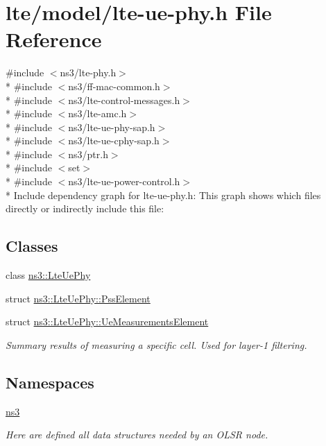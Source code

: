 \hypertarget{lte-ue-phy_8h}{}\section{lte/model/lte-\/ue-\/phy.h File Reference}
\label{lte-ue-phy_8h}
{\ttfamily \#include $<$ns3/lte-\/phy.\+h$>$}\\*
{\ttfamily \#include $<$ns3/ff-\/mac-\/common.\+h$>$}\\*
{\ttfamily \#include $<$ns3/lte-\/control-\/messages.\+h$>$}\\*
{\ttfamily \#include $<$ns3/lte-\/amc.\+h$>$}\\*
{\ttfamily \#include $<$ns3/lte-\/ue-\/phy-\/sap.\+h$>$}\\*
{\ttfamily \#include $<$ns3/lte-\/ue-\/cphy-\/sap.\+h$>$}\\*
{\ttfamily \#include $<$ns3/ptr.\+h$>$}\\*
{\ttfamily \#include $<$set$>$}\\*
{\ttfamily \#include $<$ns3/lte-\/ue-\/power-\/control.\+h$>$}\\*
Include dependency graph for lte-\/ue-\/phy.h\+:
This graph shows which files directly or indirectly include this file\+:
\subsection*{Classes}
\begin{DoxyCompactItemize}
\item 
class \hyperlink{classns3_1_1LteUePhy}{ns3\+::\+Lte\+Ue\+Phy}
\item 
struct \hyperlink{structns3_1_1LteUePhy_1_1PssElement}{ns3\+::\+Lte\+Ue\+Phy\+::\+Pss\+Element}
\item 
struct \hyperlink{structns3_1_1LteUePhy_1_1UeMeasurementsElement}{ns3\+::\+Lte\+Ue\+Phy\+::\+Ue\+Measurements\+Element}
\begin{DoxyCompactList}\small\item\em Summary results of measuring a specific cell. Used for layer-\/1 filtering. \end{DoxyCompactList}\end{DoxyCompactItemize}
\subsection*{Namespaces}
\begin{DoxyCompactItemize}
\item 
 \hyperlink{namespacens3}{ns3}
\begin{DoxyCompactList}\small\item\em Here are defined all data structures needed by an O\+L\+SR node. \end{DoxyCompactList}\end{DoxyCompactItemize}
